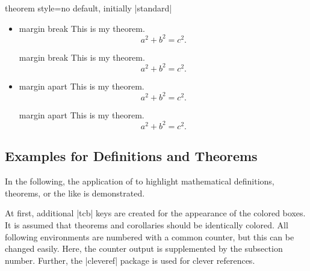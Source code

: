 \begin{docTcbKey}{theorem style}{=}{no default, initially |standard|}
\begin{itemize}
\begin{dispExample}
\begin{theorem}[theorem style=margin,left=10mm,oversize]{margin}{}
This is my theorem. \begin{equation*} a^2 + b^2 = c^2. \end{equation*}
\end{theorem}
\end{dispExample}
%
\item{}
\begin{dispExample}
\begin{theorem}[theorem style=margin break,left=10mm]{margin break}{}
This is my theorem. \begin{equation*} a^2 + b^2 = c^2. \end{equation*}
\end{theorem}
\begin{theorem}[theorem style=margin break,left=10mm,oversize]{margin break}{}
This is my theorem. \begin{equation*} a^2 + b^2 = c^2. \end{equation*}
\end{theorem}
\end{dispExample}
%
\item{}
\begin{dispExample}
\begin{theorem}[theorem style=margin apart,left=10mm]{margin apart}{}
This is my theorem. \begin{equation*} a^2 + b^2 = c^2. \end{equation*}
\end{theorem}
\begin{theorem}[theorem style=margin apart,left=10mm,oversize]{margin apart}{}
This is my theorem. \begin{equation*} a^2 + b^2 = c^2. \end{equation*}
\end{theorem}
\end{dispExample}
%
\end{itemize}
\end{docTcbKey}


%
\clearpage
\subsection{Examples for Definitions and Theorems}
In the following, the application of 
to highlight mathematical definitions, theorems, or the like is demonstrated.

At first, additional |tcb| keys are created for the appearance of
the colored boxes. It is assumed that theorems and corollaries should be
identically colored.
All following environments are numbered with a common counter, but this
can be changed easily. Here, the counter output is supplemented by
the subsection number.
Further, the |cleveref| package \cite{cubitt:2018a} is used for clever
references.

